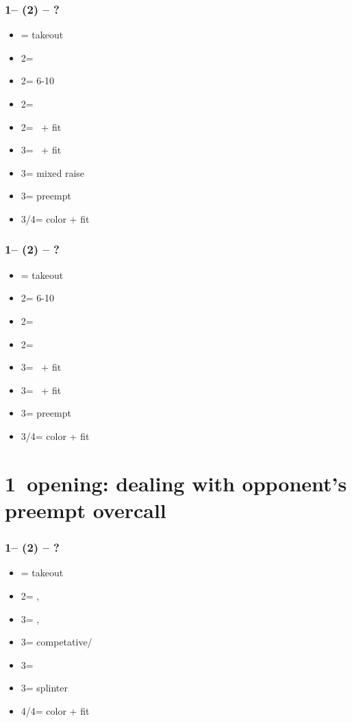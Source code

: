 \subsubsection*{1\hearts -- (2\clubs) -- ?}
\begin{itemize}
    \item \dbl = takeout
    \item 2\diams = \fonce
    \item 2\hearts = 6-10
    \item 2\spades = \fonce
    \item 2\nt = \gf\ + fit
    \item 3\clubs = \inv\ + fit
    \item 3\diams = mixed raise
    \item 3\hearts = preempt
    \item 3\spades/4\diams = color + fit
\end{itemize}

\subsubsection*{1\hearts -- (2\diams) -- ?}
\begin{itemize}
    \item \dbl = takeout
    \item 2\hearts = 6-10
    \item 2\spades = \fonce
    \item 2\nt = \clubs \invp
    \item 3\clubs = \gf\ + fit
    \item 3\diams = \inv\ + fit
    \item 3\hearts = preempt
    \item 3\spades/4\clubs = color + fit
\end{itemize}

\section{\texorpdfstring{1\hearts\ opening: dealing with opponent's preempt overcall}{oppsOvercallTfx1hPreempt}}\label{sec:oppsOvercallTfx1hPreempt}

\subsubsection*{1\hearts -- (2\spades) -- ?}
\begin{itemize}
    \item \dbl = takeout
    \item 2\nt = \clubs, \invp
    \item 3\clubs = \diams, \invp
    \item 3\diams = \hearts competative/\gf
    \item 3\hearts = \hearts\ \inv
    \item 3\spades = splinter
    \item 4\clubs/4\diams = color + fit
\end{itemize}

